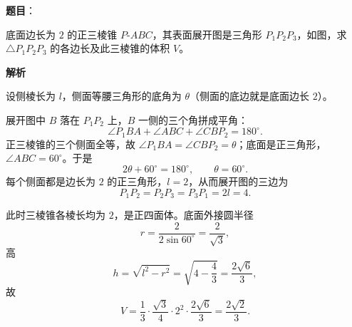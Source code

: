 \begin{answer}

\textbf{题目}：

底面边长为 $2$ 的正三棱锥 $P\text{-}ABC$，其表面展开图是三角形 $P_1P_2P_3$，如图，求 $\triangle P_1P_2P_3$ 的各边长及此三棱锥的体积 $V$。
\nopagebreak[4]
\begin{center}\end{center}
\nopagebreak[4]
\textbf{解析}

设侧棱长为 $l$，侧面等腰三角形的底角为 $\theta$（侧面的底边就是底面边长 $2$）。

展开图中 $B$ 落在 $P_1P_2$ 上，$B$ 一侧的三个角拼成平角：
\nopagebreak[4]
\[\angle P_1BA+\angle ABC+\angle CBP_2=180^\circ .\]
正三棱锥的三个侧面全等，故 $\angle P_1BA=\angle CBP_2=\theta$；底面是正三角形，$\angle ABC=60^\circ$。于是
\nopagebreak[4]
\[2\theta+60^\circ=180^\circ,\qquad\theta=60^\circ .\]
每个侧面都是边长为 $2$ 的正三角形，$l=2$，从而展开图的三边为
\nopagebreak[4]
\[P_1P_2=P_2P_3=P_3P_1=2l=4 .\]

此时三棱锥各棱长均为 $2$，是正四面体。底面外接圆半径
\nopagebreak[4]
\[r=\frac{2}{2\sin60^\circ}=\frac{2}{\sqrt3},\]
高
\nopagebreak[4]
\[h=\sqrt{l^2-r^2}=\sqrt{4-\frac43}=\frac{2\sqrt6}{3},\]
故
\nopagebreak[4]
\[V=\frac13\cdot\frac{\sqrt3}{4}\cdot2^2\cdot\frac{2\sqrt6}{3}=\frac{2\sqrt2}{3} .\]


\end{answer}
